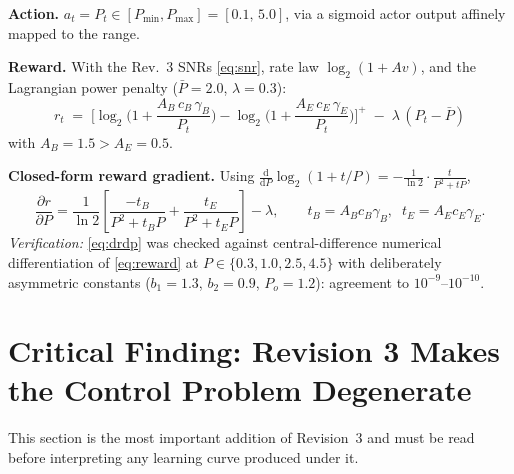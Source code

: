 \documentclass[11pt]{article}
\begin{document}
\textbf{Action.} $a_t = P_t\in[P_{\min},P_{\max}] = [0.1,\,5.0]$, via a sigmoid actor output
affinely mapped to the range.

\textbf{Reward.} With the Rev.~3 SNRs \eqref{eq:snr}, rate law $\log_2(1+Av)$, and the Lagrangian
power penalty ($\bar P = 2.0$, $\lambda = 0.3$):
\begin{equation}
\boxed{\;
r_t \;=\; \Big[\log_2\!\Big(1 + \frac{A_B\,c_B\,\gamma_B}{P_t}\Big)
- \log_2\!\Big(1 + \frac{A_E\,c_E\,\gamma_E}{P_t}\Big)\Big]^{+}
\;-\;\lambda\,(P_t - \bar P)
\;}
\label{eq:reward}
\end{equation}
with $A_B = 1.5 > A_E = 0.5$.

\textbf{Closed-form reward gradient.} Using
$\frac{\mathrm d}{\mathrm dP}\log_2(1+t/P) = -\frac{1}{\ln 2}\cdot\frac{t}{P^2+tP}$,
\begin{equation}
\frac{\partial r}{\partial P}
= \frac{1}{\ln 2}\left[\frac{-t_B}{P^{2}+t_B P} + \frac{t_E}{P^{2}+t_E P}\right] - \lambda,
\qquad t_B = A_B c_B \gamma_B,\;\; t_E = A_E c_E \gamma_E .
\label{eq:drdp}
\end{equation}
\emph{Verification:} \eqref{eq:drdp} was checked against central-difference numerical
differentiation of \eqref{eq:reward} at $P\in\{0.3, 1.0, 2.5, 4.5\}$ with deliberately asymmetric
constants ($b_1{=}1.3$, $b_2{=}0.9$, $P_o{=}1.2$): agreement to $10^{-9}$--$10^{-10}$.

\section{Critical Finding: Revision 3 Makes the Control Problem Degenerate}
\label{sec:degeneracy}
This section is the most important addition of Revision~3 and must be read before interpreting
any learning curve produced under it.
\end{document}
